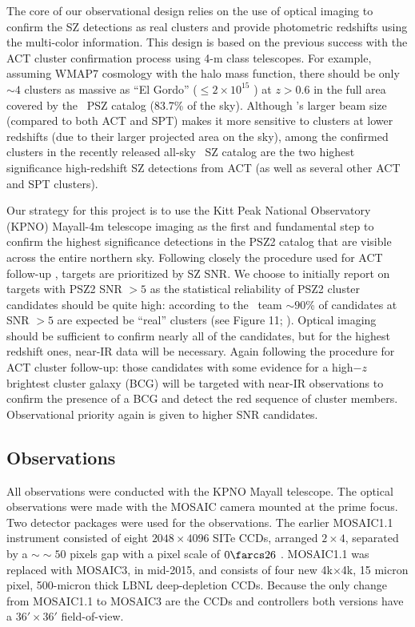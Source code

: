 \documentclass[apj, revtex4-1]{emulateapj}
\begin{document}
The core of our observational design relies on the use of optical imaging to confirm the SZ detections as real clusters and provide photometric redshifts using the multi-color information. This design is based on the previous success with the ACT cluster confirmation process using 4-m class telescopes.
%
For example, assuming WMAP7 cosmology \citep{Komatsu2011} with the \cite{Tinker2008} halo mass function, there should be only $\sim4$ clusters as massive as ``El Gordo'' ($\leq 2 \times 10^{15}$ \Msol) at $z > 0.6$ in the full area covered by the \planck\ PSZ catalog (83.7\% of the sky). Although \planck’s larger beam size (compared to both ACT and SPT) makes it more sensitive to clusters at lower redshifts (due to their larger projected area on the sky), among the confirmed clusters in the recently released all-sky \planck\ SZ catalog are the two highest significance high-redshift SZ detections from ACT (as well as several other ACT and SPT clusters).

Our strategy for this project is to use the Kitt Peak National Observatory (KPNO) Mayall-4m telescope imaging as the first and fundamental step to confirm the highest significance detections in the PSZ2 catalog that are visible across the entire northern sky.
%
%
Following closely the procedure used for ACT follow-up , targets are prioritized by SZ SNR. We choose to initially report on targets with PSZ2 SNR $>5$ as the statistical reliability of PSZ2 cluster candidates should be quite high: according to the \planck\ team $\sim90$\% of candidates at SNR $>5$ are expected be ``real'' clusters (see Figure 11; \citealt{PlanckCollaboration2015a}).
%
Optical imaging should be sufficient to confirm nearly all of the candidates, but for the highest redshift ones, near-IR data will be necessary. Again following the procedure for ACT cluster follow-up: those candidates with some evidence for a high$-z$ brightest cluster galaxy (BCG) will be targeted with near-IR observations to confirm the presence of a BCG and detect the red sequence of cluster members. Observational priority again is given to higher SNR candidates.

\subsection{Observations}\label{sec: observations}
All observations were conducted with the KPNO Mayall telescope. The optical observations were made with the MOSAIC camera mounted at the prime focus. Two detector packages were used for the observations. The earlier MOSAIC1.1 instrument consisted of eight $2048\times4096$ SITe CCDs, arranged $2\times4$, separated by a $∼\sim50$ pixels gap with a pixel scale of $0\farcs26$ \perpixel. MOSAIC1.1 was replaced with MOSAIC3, in mid-2015, and consists of four new 4k$\times$4k, 15 micron pixel, 500-micron thick LBNL deep-depletion CCDs. Because the only change from MOSAIC1.1 to MOSAIC3 are the CCDs and controllers both versions have a $36' \times 36'$ field-of-view.
\end{document}
